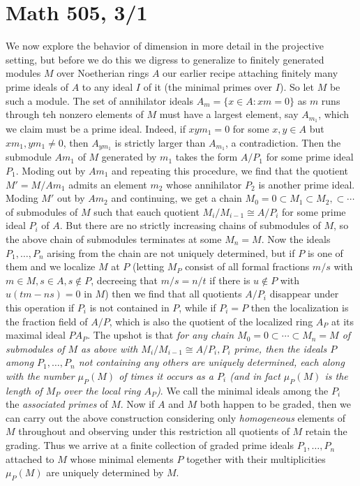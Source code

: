 \documentclass[10pt]{article}
\begin{document}
\section*{Math 505, 3/1}

We now explore the behavior of dimension in more detail in the
projective setting, but before we do this we digress to generalize to
finitely generated modules $M$ over Noetherian rings $A$ our earlier
recipe attaching finitely many prime ideals of $A$ to any ideal $I$ of
it (the minimal primes over $I$). So let $M$ be such a module. The set
of annihilator ideals $A_m = \{x\in A: xm = 0\}$ as $m$ runs through teh
nonzero elements of $M$ must have a largest element, say $A_{m_1}$,
which we claim must be a prime ideal. Indeed, if $xym_1=0$ for some
$x,y\in A$ but $xm_1,ym_1\ne0$, then $A_{ym_1}$ is strictly larger than
$A_{m_1}$, a contradiction. Then the submodule $Am_1$ of $M$ generated
by $m_1$ takes the form $A/P_1$ for some prime ideal $P_1$. Moding out
by $Am_1$ and repeating this procedure, we find that the quotient
$M'=M/Am_1$ admits an element $m_2$ whose annihilator $P_2$ is another
prime ideal. Moding $M'$ out by $Am_2$ and continuing, we get a chain
$M_0=0\subset M_1\subset M_2,\subset\cdots$ of submodules of $M$ such
that eauch quotient $M_i/M_{i-1}\cong A/P_i$ for some prime ideal $P_i$
of $A$. But there are no strictly increasing chains of submodules of
$M$, so the above chain of submodules terminates at some $M_n = M$. Now
the ideals $P_1,\ldots,P_n$ arising from the chain are not uniquely
determined, but if $P$ is one of them and we localize $M$ at $P$
(letting $M_P$ consist of all formal fractions $m/s$ with $m\in M,s\in
A,s\notin P$, decreeing that $m/s = n/t$ if there is $u\notin P $ with
$u(tm - ns) = 0$ in $M$) then we find that all quotients $A/P_i$
disappear under this operation if $P_i$ is not contained in $P$, while
if $P_i = P$ then the localization is the fraction field of $A/P$, which
is also the quotient of the localized ring $A_P$ at its maximal ideal
$PA_P$. The upshot is that {\sl for any chain $M_0 =
  0\subset\cdots\subset M_n= M$ of submodules of $M$ as above with
  $M_i/M_{i-1}\cong A/P_i, P_i$ prime, then the ideals $P$ among
  $P_1,\ldots,P_n$ not containing any others are uniquely determined,
  each along with the number $\mu_P(M)$ of times it occurs as a $P_i$
  (and in fact $\mu_P(M)$ is the length of $M_P$ over the local ring
  $A_P$)}. We call the minimal ideals among the $P_i$ the {\sl
  associated primes} of $M$. Now if $A$ and $M$ both happen to be
graded, then we can carry out the above construction considering only
{\sl homogeneous} elements of $M$ throughout and observing under this
restriction all quotients of $M$ retain the grading. Thus we arrive at a
finite collection of graded prime ideals $P_1,\ldots,P_n$ attached to
$M$ whose minimal elements $P$ together with their multiplicities
$\mu_P(M)$ are uniquely determined by $M$.
\end{document}
